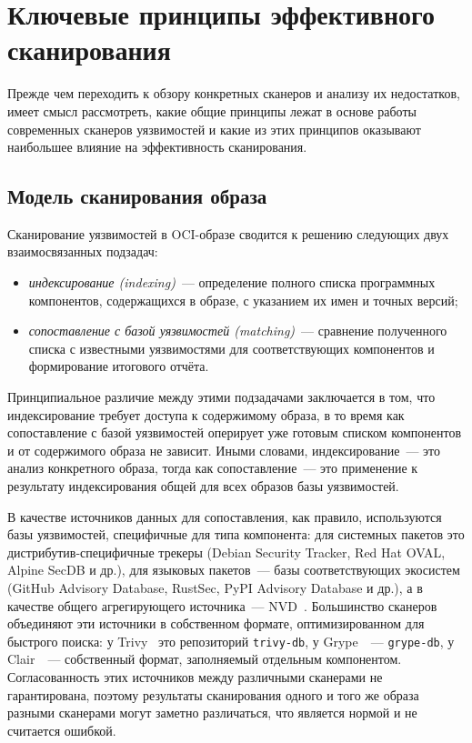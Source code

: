 \section{Ключевые принципы эффективного сканирования}
\label{sec:Chapter2} 

Прежде чем переходить к обзору конкретных сканеров и анализу их недостатков, имеет смысл рассмотреть, какие общие принципы лежат в основе работы современных сканеров уязвимостей и какие из этих принципов оказывают наибольшее влияние на эффективность сканирования.

\subsection{Модель сканирования образа}

Сканирование уязвимостей в OCI-образе сводится к решению следующих двух взаимосвязанных подзадач:

\begin{itemize}
\item \textit{индексирование (indexing)}~--- определение полного списка программных компонентов, содержащихся в образе, с указанием их имен и точных версий;
\item \textit{сопоставление с базой уязвимостей (matching)}~--- сравнение полученного списка с известными уязвимостями для соответствующих компонентов и формирование итогового отчёта.
\end{itemize}

Принципиальное различие между этими подзадачами заключается в том, что индексирование требует доступа к содержимому образа, в то время как сопоставление с базой уязвимостей оперирует уже готовым списком компонентов и от содержимого образа не зависит. Иными словами, индексирование~--- это анализ конкретного образа, тогда как сопоставление~--- это применение к результату индексирования общей для всех образов базы уязвимостей.

В качестве источников данных для сопоставления, как правило, используются базы уязвимостей, специфичные для типа компонента: для системных пакетов это дистрибутив-специфичные трекеры (Debian Security Tracker, Red Hat OVAL, Alpine SecDB и др.), для языковых пакетов~--- базы соответствующих экосистем (GitHub Advisory Database, RustSec, PyPI Advisory Database и др.), а в качестве общего агрегирующего источника~--- NVD~\cite{nvd}. Большинство сканеров объединяют эти источники в собственном формате, оптимизированном для быстрого поиска: у Trivy~\cite{trivy} это репозиторий \texttt{trivy-db}, у Grype~\cite{grype}~--- \texttt{grype-db}, у Clair~\cite{clair}~--- собственный формат, заполняемый отдельным компонентом. Согласованность этих источников между различными сканерами не гарантирована, поэтому результаты сканирования одного и того же образа разными сканерами могут заметно различаться, что является нормой и не считается ошибкой.

